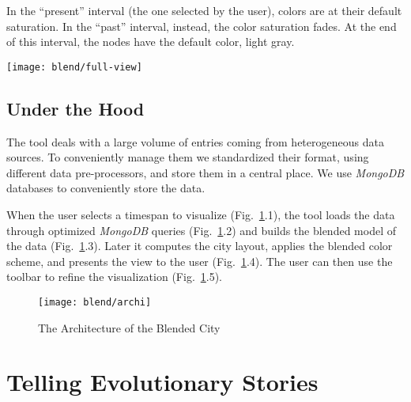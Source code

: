 
In the ``present'' interval (\ie the one selected by the user), colors are at their default saturation.
In the ``past''  interval, instead, the color saturation fades.
At the end of this interval, the nodes have the default color, \ie light gray.



\begin{figure*}[ht]
\centering
\texttt{[image: blend/full-view]}
\caption{View of the City With All the Activities}
\label{fig:full-view}
\end{figure*}



\subsection{Under the Hood}

The tool deals with a large volume of entries coming from heterogeneous data sources.
To conveniently manage them we standardized their format, using different data pre-processors, and store them in a central place.
We use \textit{MongoDB} databases to conveniently store the data.

When the user selects a timespan to visualize (Fig.~\ref{fig:archi}.1), the tool loads the data through optimized \textit{MongoDB} queries  (Fig.~\ref{fig:archi}.2) and builds the blended model of the data  (Fig.~\ref{fig:archi}.3).
Later it computes the city layout, applies the blended color scheme, and presents the view to the user (Fig.~\ref{fig:archi}.4).
The user can then use the toolbar to refine the visualization (Fig.~\ref{fig:archi}.5).

\begin{figure}[h!]
\centering
\texttt{[image: blend/archi]}
\caption{The Architecture of the Blended City}
\label{fig:archi}
\end{figure}



\section{Telling Evolutionary Stories}\label{sec:blend-stories}

